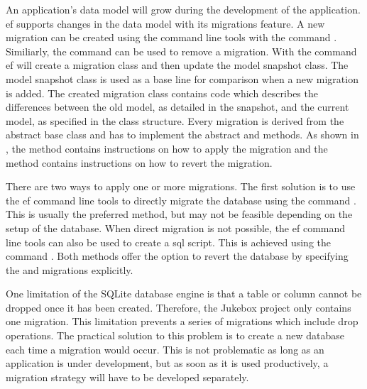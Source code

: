 
An application's data model will grow during the development of the application. \gls{ef} supports changes in the data model with its migrations feature. A new migration can be created using the command line tools with the command . Similiarly, the  command can be used to remove a migration. With the  command \gls{ef} will create a migration class and then update the model snapshot class. The model snapshot class is used as a base line for comparison when a new migration is added. The created migration class contains code which describes the differences between the old model, as detailed in the snapshot, and the current model, as specified in the class structure. Every migration is derived from the abstract base class  and has to implement the abstract  and  methods. As shown in , the  method contains instructions on how to apply the migration and the  method contains instructions on how to revert the migration. \cite{efMigrations}

There are two ways to apply one or more migrations. The first solution is to use the \gls{ef} command line tools to directly migrate the database using the command . This is usually the preferred method, but may not be feasible depending on the setup of the database. When direct migration is not possible, the \gls{ef} command line tools can also be used to create a \gls{sql} script. This is achieved using the command . Both methods offer the option to revert the database by specifying the  and  migrations explicitly.

One limitation of the SQLite database engine is that a table or column cannot be dropped once it has been created. Therefore, the Jukebox project only contains one migration. This limitation prevents a series of migrations which include drop operations. The practical solution to this problem is to create a new database each time a migration would occur. This is not problematic as long as an application is under development, but as soon as it is used productively, a migration strategy will have to be developed separately.



